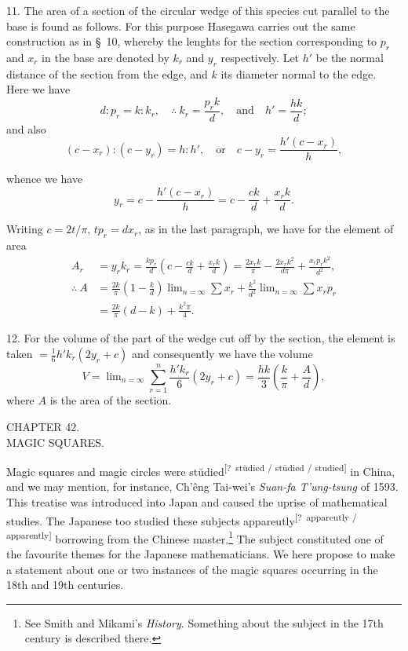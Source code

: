 \documentclass[11pt]{article}
\newcommand{\scanpage}[2]{\clearpage\setcounter{footnote}{0}\noindent{\footnotesize\color{gray}PDF page #1 · #2}\par\medskip}
\newcommand{\unclear}[1]{\textsuperscript{[?~#1]}}
\begin{document}
11. The area of a section of the circular wedge of this species cut parallel to the base is found as follows. For this purpose Hasegawa carries out the same construction as in \S~10, whereby the lenghts for the section corresponding to $p_r$ and $x_r$ in the base are denoted by $k_r$ and $y_r$ respectively. Let $h'$ be the normal distance of the section from the edge, and $k$ its diameter normal to the edge. Here we have
\[
d : p_r = k : k_r, \quad \therefore\ k_r = \frac{p_r k}{d}, \quad\text{and}\quad h' = \frac{hk}{d};
\]
and also
\[
(c - x_r) : (c - y_r) = h : h', \quad\text{or}\quad c - y_r = \frac{h'(c - x_r)}{h},
\]

\scanpage{0304}{printed page 290 (top left)}
\noindent whence we have
\[
y_r = c - \frac{h'(c-x_r)}{h} = c - \frac{ck}{d} + \frac{x_r k}{d}.
\]

Writing $c = 2t/\pi$, $tp_r = dx_r$, as in the last paragraph, we have for the element of area
\[
\begin{aligned}
A_r &= y_r k_r = \frac{kp_r}{d}\left(c - \frac{ck}{d} + \frac{x_r k}{d}\right) = \frac{2x_r k}{\pi} - \frac{2x_r k^2}{d\pi} + \frac{x_r p_r k^2}{d^2},\\
\therefore\ A &= \frac{2k}{\pi}\left(1 - \frac{k}{d}\right)\lim\nolimits_{n=\infty}\sum x_r + \frac{k^2}{d^2}\lim\nolimits_{n=\infty}\sum x_r p_r\\
&= \frac{2k}{\pi}(d-k) + \frac{k^2\pi}{4}.
\end{aligned}
\]

12. For the volume of the part of the wedge cut off by the section, the element is taken $=\frac{1}{6}h'k_r(2y_r + c)$ and consequently we have the volume
\[
V = \lim\nolimits_{n=\infty}\sum_{r=1}^{n}\frac{h'k_r}{6}(2y_r + c) = \frac{hk}{3}\left(\frac{k}{\pi} + \frac{A}{d}\right),
\]
where $A$ is the area of the section.

\begin{center}
CHAPTER 42.\\[1mm]
MAGIC SQUARES.
\end{center}

Magic squares and magic circles were stŭdied\unclear{stŭdied / stūdied / studied} in China, and we may mention, for instance, Ch'êng Tai-wei's \emph{Suan-fa T'ung-tsung} of 1593. This treatise was introduced into Japan and caused the uprise of mathematical studies. The Japanese too studied these subjects appareutly\unclear{appareutly / apparently} borrowing from the Chinese master.\footnote{See Smith and Mikami's \emph{History}. Something about the subject in the 17th century is described there.} The subject constituted one of the favourite themes for the Japanese mathematicians. We here propose to make a statement about one or two instances of the magic squares occurring in the 18th and 19th centuries.
\end{document}
